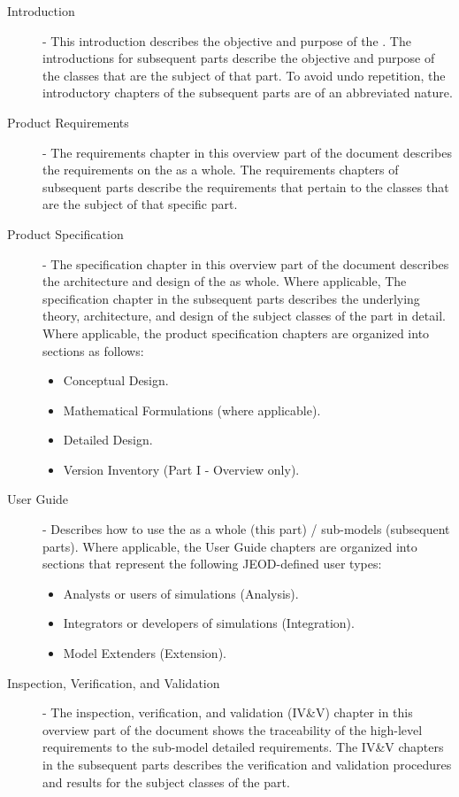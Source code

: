 \begin{description}
\item[Introduction] -
This introduction describes the objective and purpose of the \ModelDesc. The
introductions for subsequent parts describe the objective and purpose of
the classes that are the subject of that part. To avoid undo repetition, the
introductory chapters of the subsequent parts are of an abbreviated nature.

\item[Product Requirements] -
The requirements chapter in this overview part of the document describes
the requirements on the \ModelDesc as a whole.
The requirements chapters of subsequent parts describe the requirements
that pertain to the classes that are the subject of that specific part.

\item[Product Specification] -
The specification chapter in this overview part of the document describes
the architecture and design of the \ModelDesc as whole.
Where applicable,
The specification chapter in the subsequent parts describes the underlying
theory, architecture, and design of the subject classes of the part in detail.
Where applicable,
the product specification chapters are organized into sections
as follows:
\begin{itemize}
 \item Conceptual Design.
 \item Mathematical Formulations (where applicable).
 \item Detailed Design.
 \item Version Inventory (Part I - Overview only).
\end{itemize}


\item[User Guide] -
Describes how to use the \ModelDesc as a whole (this part) /
sub-models (subsequent parts).
Where applicable,
the User Guide chapters are organized into sections
that represent the following JEOD-defined user types:
\begin{itemize}
 \item Analysts or users of simulations (Analysis).
 \item Integrators or developers of simulations (Integration).
 \item Model Extenders (Extension).
\end{itemize}

\item[Inspection, Verification, and Validation] -
The inspection, verification, and validation (IV\&V) chapter
in this overview part of the document
shows the traceability of the high-level requirements to the sub-model
detailed requirements.
The IV\&V chapters in the subsequent parts describes
the verification and validation procedures and results for the subject
classes of the part.
\end{description}
